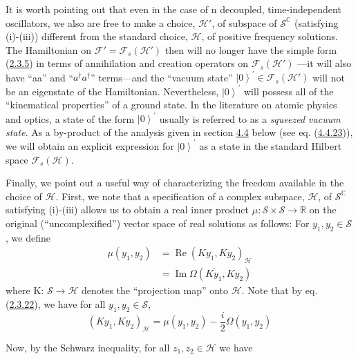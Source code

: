 \documentclass[11pt,a4paper]{article}
\providecommand{\ket}[1]{\left\lvert#1\right\rangle}
\begin{document}
It is worth pointing out that even in the case of n decoupled, time-independent oscillators, we also are free to make a choice, \(\mathcal{H}'\), of subspace of \(\mathcal{S}^{\mathbb{C}}\) (satisfying (i)-(iii)) different from the standard choice, \(\mathcal{H}\), of positive frequency solutions. The Hamiltonian on \(\mathcal{F}'=\mathcal{F}_s(\mathcal{H}')\) then will no longer have the simple form (\hyperref[eq:2.3.5]{2.3.5}) in terms of annihilation and creation operators on \(\mathcal{F}_s(\mathcal{H}')\) ---it will also have ``aa'' and ``\(a^\dagger a^\dagger\)'' terms---and the ``vacuum state'' \(\ket{0}^{\prime}\in\mathcal{F}_s(\mathcal{H}')\) will not be an eigenstate of the Hamiltonian. Nevertheless, \(\ket{0}^{\prime}\) will possess all of the ``kinematical properties'' of a ground state. In the literature on atomic physics and optics, a state of the form \(\ket{0}^{\prime}\) usually is referred to as a \emph{squeezed vacuum state}. As a by-product of the analysis given in section \hyperlink{sec:4.4}{4.4} below (see eq. (\hyperref[eq:4.4.23]{4.4.23})), we will obtain an explicit expression for \(\ket{0}^{\prime}\) as a state in the standard Hilbert space \(\mathcal{F}_s(\mathcal{H})\).

Finally, we point out a useful way of characterizing the freedom available in the choice of \(\mathcal{H}\). First, we note that a specification of a complex subspace, \(\mathcal{H}\), of \(\mathcal{S}^{\mathbb{C}}\) satisfying (i)-(iii) allows us to obtain a real inner product \(\mu: \mathcal{S} \times \mathcal{S} \to \mathbb{R}\) on the original (``uncomplexified'') vector space of real solutions as follows: For \(y_1, y_2 \in \mathcal{S}\), we define
\begin{equation*}
\begin{aligned}\mu(y_1, y_2) &= \operatorname{Re}(Ky_1, Ky_2)_{\mathcal{H}}\\&= \operatorname{Im} \Omega(\overline{Ky_1}, Ky_2)\end{aligned} \tag{2.3.24}\label{eq:2.3.24}
\end{equation*}
where K: \(\mathcal{S}\to \mathcal{H}\) denotes the ``projection map'' onto \(\mathcal{H}\). Note that by eq. (\hyperref[eq:2.3.22]{2.3.22}), we have for all \(y_1,y_2\in \mathcal{S}\),
\begin{equation*}
(Ky_1, Ky_2)_{\mathcal{H}} = \mu(y_1, y_2) - \frac{i}{2} \Omega(y_1, y_2) \tag{2.3.25}\label{eq:2.3.25}
\end{equation*}

Now, by the Schwarz inequality, for all \(z_1, z_2 \in \mathcal{H}\) we have
\end{document}
